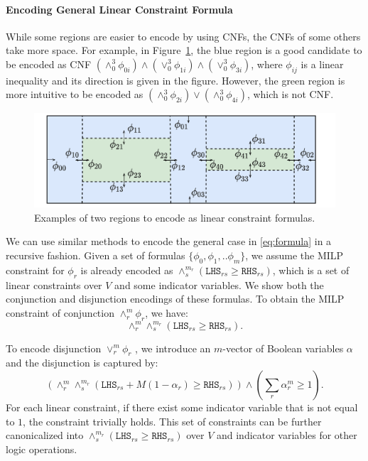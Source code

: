 \documentclass[sigconf]{acmart}
\begin{document}
\paragraph{Encoding General Linear Constraint Formula} 
While some regions are easier to encode by using CNFs, the CNFs of some others take more space. For example, in Figure~\ref{fig:segment}, the blue region is a good candidate to be encoded as CNF $(\land_0^3 \phi_{0i}) \land (\lor_0^3 \phi_{1i}) \land (\lor_0^3 \phi_{3i})$, where $\phi_{ij}$ is a linear inequality and its direction is given in the figure. However, the green region is more intuitive to  be encoded as $ (\land_0^3 \phi_{2i}) \lor (\land_0^3 \phi_{4i})$, which is not CNF.

\begin{figure}[ht]
\centering
\includegraphics[width=0.9\columnwidth]{images/segment.pdf}
\caption{\small Examples of two regions to encode as linear constraint formulas.}
\label{fig:segment}
\end{figure} 

We can use similar methods to encode the general case in \eqref{eq:formula} in a recursive fashion. Given a set of formulas $\{\phi_0, \phi_1,..\phi_m\}$, we assume the MILP constraint for $\phi_r$ is already encoded as $\land_s^{m_r} (\texttt{LHS}_{rs} \geq \texttt{RHS}_{rs})$, which is a set of linear constraints over $V$ and some indicator variables. We show both the conjunction and disjunction encodings of these formulas. To obtain the MILP constraint of conjunction $\land_r^m \phi_r$, we have:
\begin{equation}\label{eq:and}
    \land_r^m \land_s^{m_r} (\texttt{LHS}_{rs} \geq \texttt{RHS}_{rs}).
\end{equation}

To encode disjunction $\lor_r^m \phi_r$ , we introduce an $m$-vector of Boolean variables $\alpha$ and the disjunction is captured by: 
\begin{equation}\label{eq:or}
     \left( \land_r^m \land_s^{m_r}  \left( \texttt{LHS}_{rs} + M \left( 1-\alpha_{r} \right) \geq \texttt{RHS}_{rs} \right)  \right)   \land  \left( \sum_r \alpha_{r}^m \geq 1 \right) .
\end{equation}
For each linear constraint, if there exist some indicator variable that is not equal to $1$, the constraint trivially holds. This set of constraints can be further canonicalized into $\land_s^{m_r} (\texttt{LHS}_{rs} \geq \texttt{RHS}_{rs})$ over $V$ and indicator variables for other logic operations. 
\end{document}
